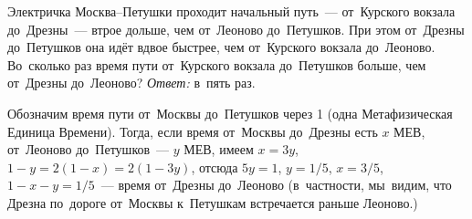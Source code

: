 \problem
Электричка Москва--Петушки проходит начальный путь~--- от~Курского вокзала
до~Дрезны~--- втрое дольше, чем от~Леоново до~Петушков.
При этом от~Дрезны до~Петушков она идёт вдвое быстрее, чем от~Курского вокзала
до~Леоново.
Во~сколько раз время пути от~Курского вокзала до~Петушков больше, чем от~Дрезны
до~Леоново?
\solution
\emph{Ответ:} в~пять раз.
\par
Обозначим время пути от~Москвы до~Петушков через 1
(одна Метафизическая Единица Времени).
Тогда, если время от~Москвы до~Дрезны есть $x$ МЕВ, от~Леоново до~Петушков~---
$y$ МЕВ, имеем $x = 3 y$, $1 - y = 2 (1 - x) = 2 (1 - 3 y)$, отсюда
$5 y = 1$, $y = 1 / 5$, $x = 3 / 5$, $1 - x - y = 1 / 5$~--- время от~Дрезны
до~Леоново (в~частности, мы~видим, что Дрезна по~дороге от~Москвы к~Петушкам
встречается раньше Леоново.)
\endproblem
